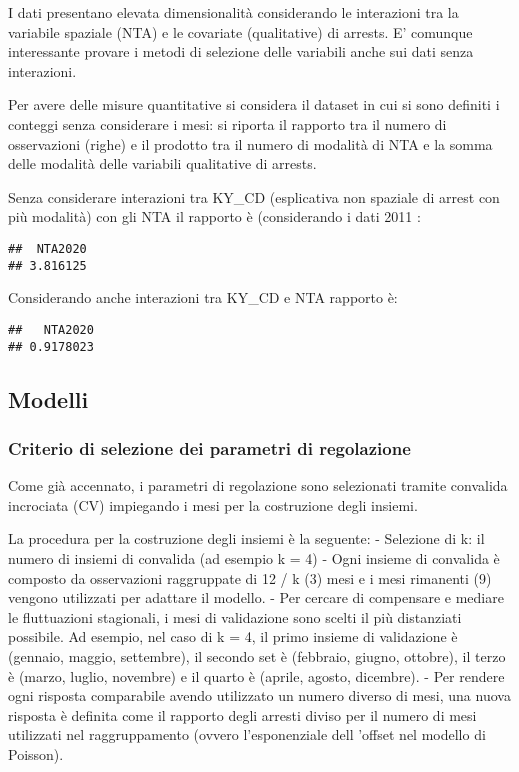 \documentclass[
  ,
]{article}
\begin{document}
I dati presentano elevata dimensionalità considerando le interazioni tra la variabile spaziale (NTA) e le covariate (qualitative) di arrests.
E' comunque interessante provare i metodi di selezione delle variabili anche sui dati senza interazioni.

Per avere delle misure quantitative si considera il dataset in cui si sono definiti i conteggi senza considerare i mesi: si riporta il rapporto tra il numero di osservazioni (righe) e il prodotto tra il numero di modalità di NTA e la somma delle modalità delle variabili qualitative di arrests.

Senza considerare interazioni tra KY\_CD (esplicativa non spaziale di arrest con più modalità) con gli NTA il rapporto è (considerando i dati 2011 :

\begin{verbatim}
##  NTA2020 
## 3.816125
\end{verbatim}

Considerando anche interazioni tra KY\_CD e NTA rapporto è:

\begin{verbatim}
##   NTA2020 
## 0.9178023
\end{verbatim}

\hypertarget{modelli}{%
\subsection{Modelli}\label{modelli}}

\hypertarget{criterio-di-selezione-dei-parametri-di-regolazione}{%
\subsubsection{Criterio di selezione dei parametri di regolazione}\label{criterio-di-selezione-dei-parametri-di-regolazione}}

Come già accennato, i parametri di regolazione sono selezionati tramite convalida incrociata (CV) impiegando i mesi per la costruzione degli insiemi.

La procedura per la costruzione degli insiemi è la seguente:
- Selezione di k: il numero di insiemi di convalida (ad esempio k = 4)
- Ogni insieme di convalida è composto da osservazioni raggruppate di 12 / k (3) mesi e i mesi rimanenti (9) vengono utilizzati per adattare il modello.
- Per cercare di compensare e mediare le fluttuazioni stagionali, i mesi di validazione sono scelti il più distanziati possibile. Ad esempio, nel caso di k = 4, il primo insieme di validazione è (gennaio, maggio, settembre), il secondo set è (febbraio, giugno, ottobre), il terzo è (marzo, luglio, novembre) e il quarto è (aprile, agosto, dicembre).
- Per rendere ogni risposta comparabile avendo utilizzato un numero diverso di mesi, una nuova risposta è definita come il rapporto degli arresti diviso per il numero di mesi utilizzati nel raggruppamento (ovvero l'esponenziale dell 'offset nel modello di Poisson).
\end{document}
